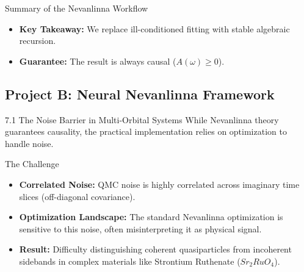 \documentclass[aspectratio=169, 11pt]{beamer}
\begin{document}
\begin{frame}{Summary of the Nevanlinna Workflow}
    \centering
    
    \vspace{0.5cm}
    \begin{itemize}
        \item \textbf{Key Takeaway:} We replace ill-conditioned fitting with stable algebraic recursion.
        \item \textbf{Guarantee:} The result is always causal ($A(\omega) \ge 0$).
    \end{itemize}
\end{frame}

\subsection{Project B: Neural Nevanlinna Framework}

\begin{frame}{7.1 The Noise Barrier in Multi-Orbital Systems}
    While Nevanlinna theory guarantees causality, the practical implementation relies on optimization to handle noise.
    
    \begin{alertblock}{The Challenge}
        \begin{itemize}
            \item \textbf{Correlated Noise:} QMC noise is highly correlated across imaginary time slices (off-diagonal covariance).
            \item \textbf{Optimization Landscape:} The standard Nevanlinna optimization is sensitive to this noise, often misinterpreting it as physical signal.
            \item \textbf{Result:} Difficulty distinguishing coherent quasiparticles from incoherent sidebands in complex materials like Strontium Ruthenate ($Sr_2RuO_4$).
        \end{itemize}
    \end{alertblock}
\end{frame}
\end{document}
